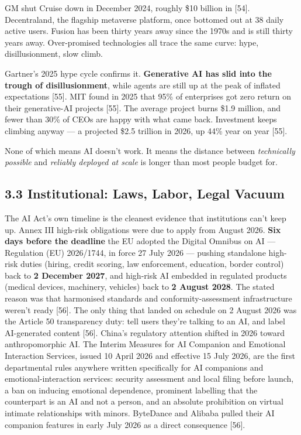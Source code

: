 \documentclass[11pt,a4paper]{article}
\begin{document}
GM shut Cruise down in December 2024, roughly \$10 billion in [54]. Decentraland, the flagship metaverse platform, once bottomed out at 38 daily active users. Fusion has been thirty years away since the 1970s and is still thirty years away. Over-promised technologies all trace the same curve: hype, disillusionment, slow climb.

Gartner's 2025 hype cycle confirms it. \textbf{Generative AI has slid into the trough of disillusionment}, while agents are still up at the peak of inflated expectations [55]. MIT found in 2025 that 95\% of enterprises got zero return on their generative-AI projects [55]. The average project burns \$1.9 million, and fewer than 30\% of CEOs are happy with what came back. Investment keeps climbing anyway --- a projected \$2.5 trillion in 2026, up 44\% year on year [55].

None of which means AI doesn't work. It means the distance between \textit{technically possible} and \textit{reliably deployed at scale} is longer than most people budget for.

\subsection{3.3 Institutional: Laws, Labor, Legal Vacuum}

The AI Act's own timeline is the cleanest evidence that institutions can't keep up. Annex III high-risk obligations were due to apply from August 2026. \textbf{Six days before the deadline} the EU adopted the Digital Omnibus on AI --- Regulation (EU) 2026/1744, in force 27 July 2026 --- pushing standalone high-risk duties (hiring, credit scoring, law enforcement, education, border control) back to \textbf{2 December 2027}, and high-risk AI embedded in regulated products (medical devices, machinery, vehicles) back to \textbf{2 August 2028}. The stated reason was that harmonised standards and conformity-assessment infrastructure weren't ready [56]. The only thing that landed on schedule on 2 August 2026 was the Article 50 transparency duty: tell users they're talking to an AI, and label AI-generated content [56]. China's regulatory attention shifted in 2026 toward anthropomorphic AI. The Interim Measures for AI Companion and Emotional Interaction Services, issued 10 April 2026 and effective 15 July 2026, are the first departmental rules anywhere written specifically for AI companions and emotional-interaction services: security assessment and local filing before launch, a ban on inducing emotional dependence, prominent labelling that the counterpart is an AI and not a person, and an absolute prohibition on virtual intimate relationships with minors. ByteDance and Alibaba pulled their AI companion features in early July 2026 as a direct consequence [56].
\end{document}
